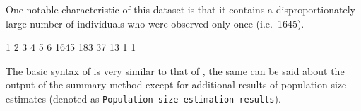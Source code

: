 \documentclass[
]{jss}
\newcommand{\1}{\mathcal{I}} \newcommand{\bZero}{\boldsymbol{0}}
\begin{document}
One notable characteristic of this dataset is that it contains a
disproportionately large number of individuals who were observed only
once (i.e.~1645).

\begin{CodeChunk}
\begin{CodeOutput}

   1    2    3    4    5    6 
1645  183   37   13    1    1 
\end{CodeOutput}
\end{CodeChunk}

The basic syntax of  is very similar to that of
, the same can be said about the output of the summary method
except for additional results of population size estimates (denoted as
\texttt{Population size estimation results}).
\end{document}
